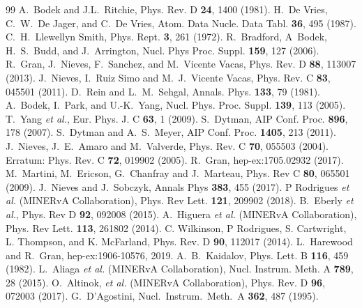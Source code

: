 \begin{thebibliography}{99}
A.~Bodek and J.L.~Ritchie, Phys. Rev. D \textbf{24}, 1400 (1981).
%
H.~De Vries, C.~W.~De Jager, and C.~De Vries, Atom. Data Nucle. Data Tabl. {\bf 36}, 495 (1987).
%
C.~H.~Llewellyn Smith, Phys. Rept. {\bf 3}, 261 (1972).
%
R.~Bradford, A~Bodek, H.~S.~Budd, and J.~Arrington, Nucl. Phys Proc. Suppl. {\bf 159}, 127 (2006).
%
R.~Gran, J.~Nieves, F.~Sanchez, and M.~Vicente Vacas, Phys. Rev. D \textbf{88}, 113007 (2013).
%
J.~Nieves, I.~Ruiz Simo and M.~J.~Vicente Vacas,
Phys. Rev. C \textbf{83}, 045501 (2011).
%
D.~Rein and L.~M.~Sehgal, Annals. Phys. {\bf 133}, 79 (1981).
%
A.~Bodek, I.~Park, and U.-K.~Yang, Nucl. Phys. Proc. Suppl. {\bf 139}, 113 (2005).
%
T.~Yang {\it et al.}, Eur. Phys. J. C {\bf 63}, 1 (2009).
%
S.~Dytman, AIP Conf. Proc. {\bf 896}, 178 (2007).
%
S.~Dytman and A.~S.~Meyer, AIP Conf. Proc. {\bf 1405}, 213 (2011).
%
J.~Nieves, J.~E.~Amaro and M.~Valverde, Phys. Rev. C \textbf{70}, 055503 (2004). Erratum: Phys. Rev. C {\bf 72}, 019902 (2005).
%
R.~Gran, hep-ex:1705.02932 (2017).
%
M.~Martini, M.~Ericson, G.~Chanfray and J.~Marteau, Phys. Rev C {\bf 80}, 065501 (2009).
%
J.~Nieves and J.~Sobczyk, Annals Phys {\bf 383}, 455 (2017).
%
P Rodrigues {\it et al.} (MINERvA Collaboration), Phys. Rev Lett. {\bf 121}, 209902 (2018).
%
B.~Eberly {\it et al.}, Phys. Rev D {\bf 92}, 092008 (2015).
%
A.~Higuera {\it et al.} (MINERvA Collaboration), Phys. Rev Lett. {\bf 113}, 261802 (2014).
%
C. Wilkinson, P Rodrigues, S. Cartwright, L. Thompson, and K. McFarland, Phys. Rev. D \textbf{90}, 112017 (2014).
%
L.~Harewood and R.~Gran, hep-ex:1906-10576, 2019.
%
A.~B.~Kaidalov, Phys. Lett. B {\bf 116}, 459 (1982).
%
L.~Aliaga {\it et al.} (MINERvA Collaboration), Nucl. Instrum. Meth. A {\bf 789}, 28 (2015).
%
 O.~Altinok, {\it et al.} (MINERvA Collaboration), Phys. Rev. D \textbf{96}, 072003 (2017).
%
  G.~D'Agostini,
  Nucl.\ Instrum.\ Meth.\ A {\bf 362}, 487 (1995).
   

\end{thebibliography}
